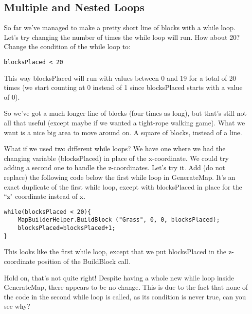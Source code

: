 \documentclass{article}
\begin{document}
\subsection{Multiple and Nested Loops}

So far we've managed to make a pretty short line of blocks with a while loop. Let's try changing the number of times the while loop will run. How about 20? Change the condition of the while loop to: 

\lstset{style=sharpc}
\begin{lstlisting}
blocksPlaced < 20
\end{lstlisting} 

This way blocksPlaced will run with values between 0 and 19 for a total of 20 times (we start counting at 0 instead of 1 since blocksPlaced starts with a value of 0). 

\noindent{}

So we've got a much longer line of blocks (four times as long), but that's still not all that useful (except maybe if we wanted a tight-rope walking game). What we want is a nice big area to move around on. A square of blocks, instead of a line. 

What if we used two different while loops? We have one where we had the changing variable (blocksPlaced) in place of the x-coordinate. We could try adding a second one to handle the z-coordinates. Let's try it. Add (do not replace) the following code below the first while loop in GenerateMap. It's an exact duplicate of the first while loop, except with blocksPlaced in place for the ``z" coordinate instead of x.

\lstset{style=sharpc}
\begin{lstlisting}
while(blocksPlaced < 20){
	MapBuilderHelper.BuildBlock ("Grass", 0, 0, blocksPlaced);
	blocksPlaced=blocksPlaced+1;
}
\end{lstlisting} 

This looks like the first while loop, except that we put blocksPlaced in the z-coordinate position of the BuildBlock call. 

\noindent{}

Hold on, that's not quite right! Despite having a whole new while loop inside GenerateMap, there appears to be no change. This is due to the fact that none of the code in the second while loop is called, as its condition is never true, can you see why?
\end{document}
